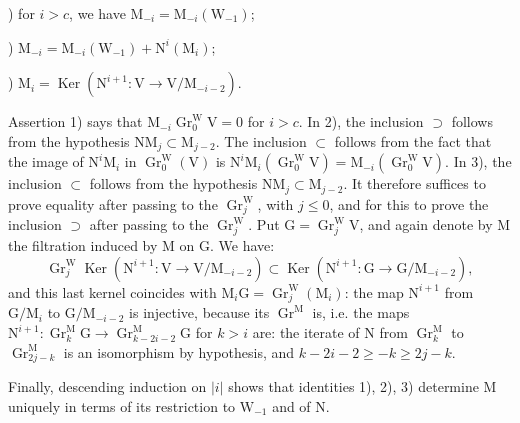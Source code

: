 \documentclass[11pt,leqno]{article}
\begin{document}
) for \(i>c\), we have \(\mathrm{M}_{-i}=\mathrm{M}_{-i}(\mathrm{W}_{-1})\);

) \(\mathrm{M}_{-i}=\mathrm{M}_{-i}(\mathrm{W}_{-1})+\mathrm{N}^i(\mathrm{M}_i)\);

) \(\mathrm{M}_i=\operatorname{Ker}(\mathrm{N}^{i+1}:\mathrm{V}\to\mathrm{V}/\mathrm{M}_{-i-2})\).

\noindent Assertion 1) says that \(\mathrm{M}_{-i}\operatorname{Gr}_0^{\mathrm{W}}\mathrm{V}=0\) for \(i>c\). In 2), the inclusion \(\supset\) follows from the hypothesis \(\mathrm{N}\mathrm{M}_j\subset\mathrm{M}_{j-2}\). The inclusion \(\subset\) follows from the fact that the image of \(\mathrm{N}^i\mathrm{M}_i\) in \(\operatorname{Gr}_0^{\mathrm{W}}(\mathrm{V})\) is \(\mathrm{N}^i\mathrm{M}_i(\operatorname{Gr}_0^{\mathrm{W}}\mathrm{V})=\mathrm{M}_{-i}(\operatorname{Gr}_0^{\mathrm{W}}\mathrm{V})\). In 3), the inclusion \(\subset\) follows from the hypothesis \(\mathrm{N}\mathrm{M}_j\subset\mathrm{M}_{j-2}\). It therefore suffices to prove equality after passing to the \(\operatorname{Gr}_j^{\mathrm{W}}\), with \(j\leq0\), and for this to prove the inclusion \(\supset\) after passing to the \(\operatorname{Gr}_j^{\mathrm{W}}\). Put \(\mathrm{G}=\operatorname{Gr}_j^{\mathrm{W}}\mathrm{V}\), and again denote by \(\mathrm{M}\) the filtration induced by \(\mathrm{M}\) on \(\mathrm{G}\). We have:
\[
\operatorname{Gr}_j^{\mathrm{W}}\operatorname{Ker}
(\mathrm{N}^{i+1}:\mathrm{V}\to\mathrm{V}/\mathrm{M}_{-i-2})
\subset
\operatorname{Ker}
(\mathrm{N}^{i+1}:\mathrm{G}\to\mathrm{G}/\mathrm{M}_{-i-2}),
\]
and this last kernel coincides with \(\mathrm{M}_i\mathrm{G}=\operatorname{Gr}_j^{\mathrm{W}}(\mathrm{M}_i)\): the map \(\mathrm{N}^{i+1}\) from \(\mathrm{G}/\mathrm{M}_i\) to \(\mathrm{G}/\mathrm{M}_{-i-2}\) is injective, because its \(\operatorname{Gr}^{\mathrm{M}}\) is, i.e. the maps \(\mathrm{N}^{i+1}:\operatorname{Gr}_k^{\mathrm{M}}\mathrm{G}\to\operatorname{Gr}_{k-2i-2}^{\mathrm{M}}\mathrm{G}\) for \(k>i\) are: the iterate of \(\mathrm{N}\) from \(\operatorname{Gr}_k^{\mathrm{M}}\) to \(\operatorname{Gr}_{2j-k}^{\mathrm{M}}\) is an isomorphism by hypothesis, and \(k-2i-2\geq -k\geq2j-k\).

Finally, descending induction on \(|i|\) shows that identities 1), 2), 3) determine \(\mathrm{M}\) uniquely in terms of its restriction to \(\mathrm{W}_{-1}\) and of \(\mathrm{N}\).
\end{document}
